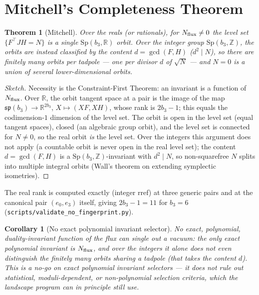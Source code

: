 \documentclass[11pt]{article}
\newtheorem{theorem}{Theorem}
\newtheorem{corollary}{Corollary}
\newcommand{\bthree}{b_3}
\newcommand{\flux}{F}
\newcommand{\hh}{H}
\begin{document}
\section{Mitchell's Completeness Theorem}

\begin{theorem}[Mitchell]
Over the reals (or rationals), for $N_{\rm flux}\neq 0$ the level set
$\{\flux^\top J\hh=N\}$ is a single $\mathrm{Sp}(\bthree,\mathbb{R})$ orbit. Over the
integer group $\mathrm{Sp}(\bthree,\mathbb{Z})$, the orbits are instead classified by the
content $d=\gcd(F,H)$ ($d^2\mid N$), so there are \emph{finitely many} orbits per tadpole
--- one per divisor $d$ of $\sqrt{N}$ --- and $N=0$ is a union of several lower-dimensional
orbits.
\end{theorem}

\begin{proof}[Sketch]
Necessity is the Constraint-First Theorem: an invariant is a function of $N_{\rm flux}$.
Over $\mathbb{R}$, the orbit tangent space at a pair is the image of the map
$\mathfrak{sp}(\bthree)\to\mathbb{R}^{2\bthree}$, $X\mapsto (X\flux,X\hh)$, whose rank is
$2\bthree-1$; this equals the codimension-$1$ dimension of the level set. The orbit is open
in the level set (equal tangent spaces), closed (an algebraic group orbit), and the level set
is connected for $N\neq 0$, so the real orbit \emph{is} the level set. Over the integers this
argument does not apply (a countable orbit is never open in the real level set); the content
$d=\gcd(F,H)$ is a $\mathrm{Sp}(\bthree,\mathbb{Z})$-invariant with $d^2\mid N$, so
non-squarefree $N$ splits into multiple integral orbits (Wall's theorem on extending
symplectic isometries).
\end{proof}

The real rank is computed exactly (integer rref) at three generic pairs and at the
canonical pair $(e_0,e_3)$ itself, giving $2\bthree-1=11$ for $\bthree=6$
(\texttt{scripts/validate\_no\_fingerprint.py}).

\begin{corollary}[No exact polynomial invariant selector]
No exact, polynomial, duality-invariant function of the flux can single out a vacuum: the
only exact polynomial invariant is $N_{\rm flux}$, and over the integers it alone does not even
distinguish the finitely many orbits sharing a tadpole (that takes the content $d$). This is
a no-go on \emph{exact polynomial invariant} selectors --- it does \emph{not} rule out statistical,
moduli-dependent, or non-polynomial selection criteria, which the landscape program can in
principle still use.
\end{corollary}
\end{document}

